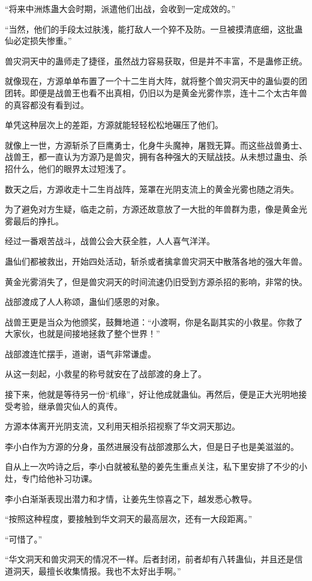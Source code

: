 \begin{this_body}
“将来中洲炼蛊大会时期，派遣他们出战，会收到一定成效的。”

“当然，他们的手段太过肤浅，能打敌人一个猝不及防。一旦被摸清底细，这批蛊仙必定损失惨重。”

兽灾洞天中的蛊师走了捷径，虽然战力容易获取，但是并不丰富，不是蛊修正统。

就像现在，方源单单布置了一个十二生肖大阵，就将整个兽灾洞天中的蛊仙耍的团团转。即便是战兽王也看不出真相，仍旧以为是黄金光雾作祟，连十二个太古年兽的真容都没有看到过。

单凭这种层次上的差距，方源就能轻轻松松地碾压了他们。

就像上一世，方源斩杀了巨鹰勇士，化身牛头魔神，屠戮无算。而这些战兽勇士、战兽王，都一直认为方源乃是兽灾，拥有各种强大的天赋战技。从未想过蛊虫、杀招什么，他们的眼界太过短浅了。

数天之后，方源收走十二生肖战阵，笼罩在光阴支流上的黄金光雾也随之消失。

为了避免对方生疑，临走之前，方源还故意放了一大批的年兽群为患，像是黄金光雾最后的挣扎。

经过一番艰苦战斗，战兽公会大获全胜，人人喜气洋洋。

蛊仙们都被救出，开始四处活动，斩杀或者擒拿兽灾洞天中散落各地的强大年兽。

黄金光雾消失了，但是兽灾洞天的时间流速仍旧受到方源杀招的影响，非常的快。

战部渡成了人人称颂，蛊仙们感恩的对象。

战兽王更是当众为他颁奖，鼓舞地道：“小渡啊，你是名副其实的小救星。你救了大家伙，也就是间接地拯救了整个世界！”

战部渡连忙摆手，道谢，语气非常谦虚。

从这一刻起，小救星的称号就安在了战部渡的身上了。

接下来，他就是等待另一份“机缘”，好让他成就蛊仙。再然后，便是正大光明地接受考验，继承兽灾仙人的真传。

方源本体离开光阴支流，又利用天相杀招视察了华文洞天那边。

李小白作为方源的分身，虽然进展没有战部渡那么大，但是日子也是美滋滋的。

自从上一次吟诗之后，李小白就被私塾的姜先生重点关注，私下里安排了不少的小灶，专门给他补习功课。

李小白渐渐表现出潜力和才情，让姜先生惊喜之下，越发悉心教导。

“按照这种程度，要接触到华文洞天的最高层次，还有一大段距离。”

“可惜了。”

“华文洞天和兽灾洞天的情况不一样。后者封闭，前者却有八转蛊仙，并且还是信道洞天，最擅长收集情报。我也不太好出手啊。”


\end{this_body}

